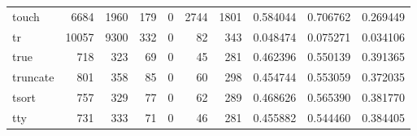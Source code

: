 \begin{tabular}{lrrrrrrrrr}
touch     &                                               6684 &                                               1960 &                                                179 &                                                  0 &                                               2744 &                                               1801 &                                           0.584044 &                               0.706762 &                             0.269449 \\
tr        &                                              10057 &                                               9300 &                                                332 &                                                  0 &                                                 82 &                                                343 &                                           0.048474 &                               0.075271 &                             0.034106 \\
true      &                                                718 &                                                323 &                                                 69 &                                                  0 &                                                 45 &                                                281 &                                           0.462396 &                               0.550139 &                             0.391365 \\
truncate  &                                                801 &                                                358 &                                                 85 &                                                  0 &                                                 60 &                                                298 &                                           0.454744 &                               0.553059 &                             0.372035 \\
tsort     &                                                757 &                                                329 &                                                 77 &                                                  0 &                                                 62 &                                                289 &                                           0.468626 &                               0.565390 &                             0.381770 \\
tty       &                                                731 &                                                333 &                                                 71 &                                                  0 &                                                 46 &                                                281 &                                           0.455882 &                               0.544460 &                             0.384405 \\

\end{tabular}
